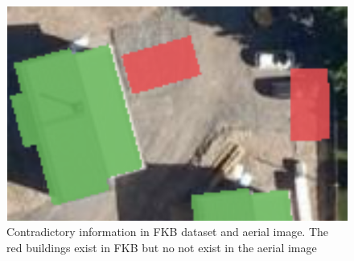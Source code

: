 \begin{figure}[H]
	\centering
	\includegraphics[width=0.5\linewidth]{fig/building_notbuilding}
	\caption{Contradictory information in FKB dataset and aerial image. The red buildings exist in FKB but no not exist in the aerial image \citep{Orstavik2017}}
	\label{fig:buildingnotbuilding}
\end{figure}



